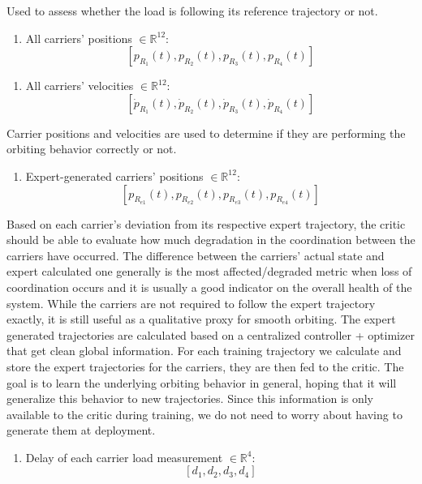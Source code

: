 Used to assess whether the load is following its reference trajectory
or not.

\begin{enumerate}[resume]
  \item All carriers’ positions $\in \mathbb{R}^{12}$:
  \[
    [p_{R_1}(t), p_{R_2}(t), p_{R_3}(t), p_{R_4}(t)]
  \]
\end{enumerate}

\begin{enumerate}[resume]
  \item All carriers’ velocities $\in \mathbb{R}^{12}$:
  \[
    [\dot{p}_{R_1}(t), \dot{p}_{R_2}(t), \dot{p}_{R_3}(t), \dot{p}_{R_4}(t)]
  \]
\end{enumerate}

Carrier positions and velocities are used to determine if they are
performing the orbiting behavior correctly or not.

\begin{enumerate}[resume]
  \item Expert-generated carriers’ positions $\in \mathbb{R}^{12}$:
  \[
    [p_{R_{e1}}(t), p_{R_{e2}}(t), p_{R_{e3}}(t), p_{R_{e4}}(t)]
  \]
\end{enumerate}

Based on each carrier’s deviation from its respective expert trajectory,
the critic should be able to evaluate how much degradation in the
coordination between the carriers have occurred. The difference between
the carriers’ actual state and expert calculated one generally is the most
affected/degraded metric when loss of coordination occurs and it is
usually a good indicator on the overall health of the system. While the
carriers are not required to follow the expert trajectory exactly, it is
still useful as a qualitative proxy for smooth orbiting. The expert
generated trajectories are calculated based on a centralized controller
+ optimizer that get clean global information. For each training
trajectory we calculate and store the expert trajectories for the
carriers, they are then fed to the critic. The goal is to learn the
underlying orbiting behavior in general, hoping that it will generalize
this behavior to new trajectories. Since this information is only
available to the critic during training, we do not need to worry about
having to generate them at deployment.

\begin{enumerate}[resume]
  \item Delay of each carrier load measurement $\in \mathbb{R}^4$:
  \[
    [d_1, d_2, d_3, d_4]
  \]
\end{enumerate}

